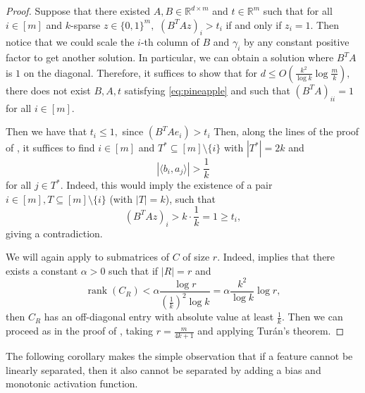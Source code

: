 \documentclass[11pt]{article}
\newcommand{\RR}{\mathbb{R}}
\DeclareMathOperator{\rank}{rank}
\begin{document}
\begin{proof}
    Suppose that there existed $A,B\in \RR^{d\times m}$ and $t\in \RR^m$ such that for all $i\in [m]$ and $k$-sparse $z\in \{0,1\}^m,$ $(B^TAz)_i > t_i$ if and only if $z_i = 1.$ Then notice that we could scale the $i$-th column of $B$ and $\gamma_i$ by any constant positive factor to get another solution. In particular, we can obtain a solution where $B^TA$ is $1$ on the diagonal. Therefore, it suffices to show that for $d \le O(\frac{k^2}{\log k}\log \frac{m}{k}),$ there does not exist $B,A,t$ satisfying \eqref{eq:pineapple} and such that $(B^TA)_{ii} = 1$ for all $i\in [m].$

    Then we have that $t_i \le 1,$ since $(B^TAe_i) > t_i$ Then, along the lines of the proof of , it suffices to find $i\in [m]$ and $T^*\subseteq [m]\setminus \{i\}$ with $|T^*|=2k$ and
    \begin{equation}
        |\langle b_i, a_j \rangle| > \frac{1}{k}
    \end{equation}
    for all $j\in T^*$. Indeed, this would imply the existence of a pair $i\in [m], T\subseteq [m]\setminus\{i\}$ (with $|T|=k$), such that
    \begin{equation}
        (B^TAz)_i > k\cdot \frac{1}{k} = 1 \ge t_i,
    \end{equation}
    giving a contradiction.

    We will again apply  to submatrices of $C$ of size $r$. Indeed,  implies that there exists a constant $\alpha > 0$ such that if $|R|=r$ and
    \begin{equation}
        \rank(C_R) < \alpha \frac{\log r}{(\frac{1}{k})^2\log k} = \alpha \frac{k^2}{\log k}\log r,
    \end{equation}
    then $C_R$ has an off-diagonal entry with absolute value at least $\frac{1}{k}.$ Then we can proceed as in the proof of , taking $r = \frac{m}{4k+1}$ and applying Tur\'an's theorem.
\end{proof}

The following corollary makes the simple observation that if a feature cannot be linearly separated, then it also cannot be separated by adding a bias and monotonic activation function.
\end{document}
